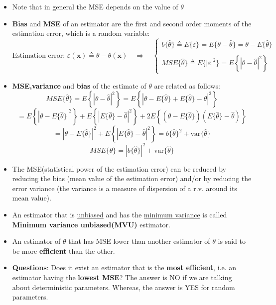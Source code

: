 \begin{itemize}
\[
MSE\{ \hat{\theta} \} = E \left\{ | \theta - \hat{\theta} |^2 \right\}
= \int_{-\infty}^{+\infty} | \theta - \hat{\theta} |^2 f_{\hat{\theta}}(\hat{\theta}; \theta) d\hat{\theta}
= \int \! \!\! \int | \theta - \hat{\theta}(\mathbf{x}) |^2 f_X(\mathbf{x}; \theta) d\mathbf{x}
\]
    \item Note that in general the MSE depends on the value of \(\theta\)
    \item \textbf{Bias} and \textbf{MSE} of an estimator are the first and second order moments of the estimation error, which is a random variable:
    \[
\text{Estimation error: } \varepsilon(\mathbf{x}) \triangleq \theta - \hat{\theta}(\mathbf{x}) \quad
{\Longrightarrow}\quad
\begin{cases}
b\{\hat{\theta}\} \triangleq E\{\varepsilon\} = E\{\theta - \hat{\theta}\} = \theta - E\{\hat{\theta}\} \\
\\
MSE\{\hat{\theta}\} \triangleq E\{|\varepsilon|^2\} = E\left\{|\theta - \hat{\theta}|^2\right\}
\end{cases}
\]
\item \textbf{MSE,variance} and \textbf{bias} of the estimate of \(\theta\) are related as follows:
\[
MSE\{ \hat{\theta} \} = E \left\{ | \theta - \hat{\theta} |^2 \right\}
= E \left\{ \left| \theta - E\{\hat{\theta}\} + E\{\hat{\theta}\} - \hat{\theta} \right|^2 \right\}
\]
\[
= E\left\{ \left| \theta - E\{\hat{\theta}\} \right|^2 \right\}
+ E\left\{ \left| E\{\hat{\theta}\} - \hat{\theta} \right|^2 \right\}
+ 2 E\left\{ \left( \theta - E\{\hat{\theta}\} \right) \left( E\{\hat{\theta}\} - \hat{\theta} \right) \right\}
\]
\[
= |\theta - E\{\hat{\theta}\}|^2
+ E\left\{ | E\{\hat{\theta}\} - \hat{\theta}|^2 \right\}
= b\{\hat{\theta}\}^2
+ \text{var}\{ \hat{\theta} \}
\]
\[
MSE\{\hat{\theta}\}=|b\{\hat{\theta}\}|^2+\text{var}\{\hat{\theta}\}
\]
\item The MSE(statistical power of the estimation error) can be reduced by reducing the bias (mean value of the estimation error) and/or by reducing the error variance (the variance is a measure of dispersion of a r.v. around its mean value).
\item An estimator that is \underline{unbiased} and has the \underline{minimum variance} is called \textbf{Minimum variance unbiased(MVU)} estimator.
\item An estimator of \(\theta\) that has MSE lower than another estimator of \(\theta\) is said to be more \textbf{efficient} than the other.
\item \textbf{Questions}: Does it exist an estimator that is the \textbf{most efficient}, i.e. an estimator having the \textbf{lowest MSE}? The answer is NO if we are talking about deterministic parameters. Whereas, the answer is YES for random parameters.

\end{itemize}

